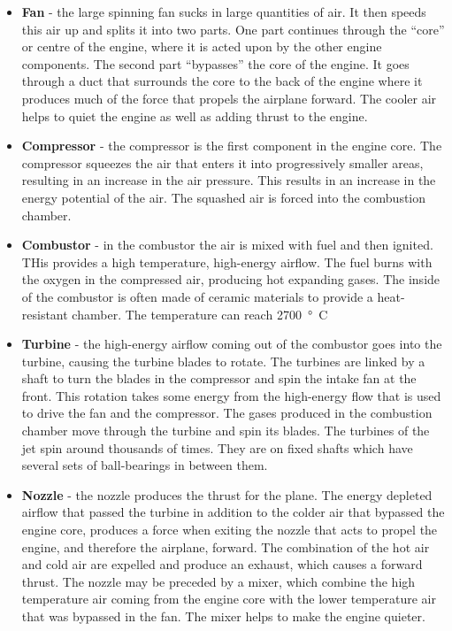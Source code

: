 \begin{itemize}
    \item \textbf{Fan} - the large spinning fan sucks in large quantities of air. It then speeds this air up and splits it into two parts. One part continues through the ``core'' or centre of the engine, where it is acted upon by the other engine components. The second part ``bypasses'' the core of the engine. It goes through a duct that surrounds the core to the back of the engine where it produces much of the force that propels the airplane forward. The cooler air helps to quiet the engine as well as adding thrust to the engine.
    \item \textbf{Compressor} - the compressor is the first component in the engine core. The compressor squeezes the air that enters it into progressively smaller areas, resulting in an increase in the air pressure. This results in an increase in the energy potential of the air. The squashed air is forced into the combustion chamber.
    \item \textbf{Combustor} - in the combustor the air is mixed with fuel and then ignited. THis provides a high temperature, high-energy airflow. The fuel burns with the oxygen in the compressed air, producing hot expanding gases. The inside of the combustor is often made of ceramic materials to provide a heat-resistant chamber. The temperature can reach \SI{2700}{\degree C}
    \item \textbf{Turbine} - the high-energy airflow coming out of the combustor goes into the turbine, causing the turbine blades to rotate. The turbines are linked by a shaft to turn the blades in the compressor and spin the intake fan at the front. This rotation takes some energy from the high-energy flow that is used to drive the fan and the compressor. The gases produced in the combustion chamber move through the turbine and spin its blades. The turbines of the jet spin around thousands of times. They are on fixed shafts which have several sets of ball-bearings in between them.
    \item \textbf{Nozzle} - the nozzle produces the thrust for the plane. The energy depleted airflow that passed the turbine in addition to the colder air that bypassed the engine core, produces a force when exiting the nozzle that acts to propel the engine, and therefore the airplane, forward. The combination of the hot air and cold air are expelled and produce an exhaust, which causes a forward thrust. The nozzle may be preceded by a mixer, which combine the high temperature air coming from the engine core with the lower temperature air that was bypassed in the fan. The mixer helps to make the engine quieter.
\end{itemize}
